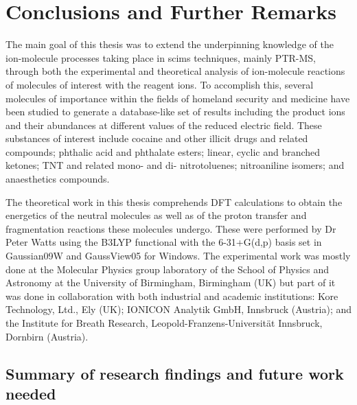 \chapter{Conclusions and Further Remarks}

The main goal of this thesis was to extend the underpinning knowledge of the ion-molecule processes taking place in \acrshort{scims} techniques, mainly PTR-MS, through both the experimental and theoretical analysis of ion-molecule reactions of molecules of interest with the reagent ions. %
%
To accomplish this, several molecules of importance within the fields of homeland security and medicine have been studied to generate a database-like set of results including the product ions and their abundances at different values of the reduced electric field.
%
These substances of interest include  cocaine and other illicit drugs and related compounds; 
phthalic acid and phthalate esters; 
linear, cyclic and branched ketones; 
TNT and related mono- and di- nitrotoluenes;
nitroaniline isomers;
and 
anaesthetics compounds.



The theoretical work in this thesis comprehends DFT calculations to obtain the energetics of the neutral molecules as well as of the proton transfer and fragmentation reactions these molecules undergo.
%
These were performed by Dr Peter Watts using the B3LYP functional with the 6-31+G(d,p) basis set in Gaussian09W and GaussView05 for Windows.
%
The experimental work was mostly done at the  Molecular Physics group laboratory of the School of Physics and Astronomy at the University of Birmingham, Birmingham (UK)
but part of it was done in collaboration with both industrial and academic institutions: 
Kore Technology, Ltd.,  Ely (UK);
IONICON Analytik GmbH, Innsbruck (Austria);
and
the Institute for Breath Research, Leopold-Franzens-Universität Innsbruck, Dornbirn (Austria).


\section{Summary of research findings and future work needed}

